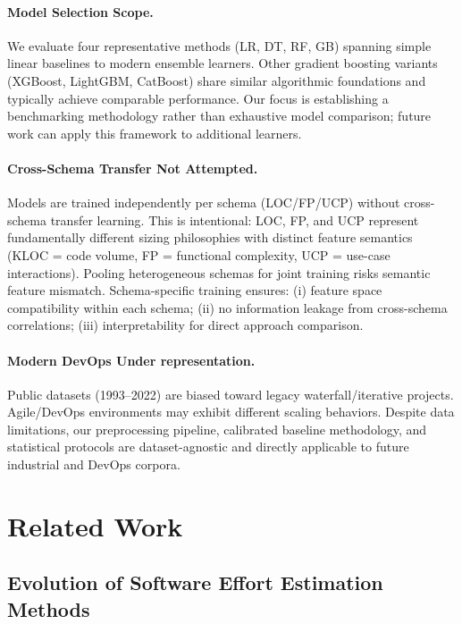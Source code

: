 \documentclass[11pt,a4paper]{article}
\begin{document}
\paragraph{Model Selection Scope.}
We evaluate four representative methods (LR, DT, RF, GB) spanning simple linear baselines to modern ensemble learners. Other gradient boosting variants (XGBoost, LightGBM, CatBoost) share similar algorithmic foundations and typically achieve comparable performance. Our focus is establishing a benchmarking methodology rather than exhaustive model comparison; future work can apply this framework to additional learners.

\paragraph{Cross-Schema Transfer Not Attempted.}
Models are trained independently per schema (LOC/FP/UCP) without cross-schema transfer learning. This is intentional: LOC, FP, and UCP represent fundamentally different sizing philosophies with distinct feature semantics (KLOC = code volume, FP = functional complexity, UCP = use-case interactions). Pooling heterogeneous schemas for joint training risks semantic feature mismatch. Schema-specific training ensures: (i) feature space compatibility within each schema; (ii) no information leakage from cross-schema correlations; (iii) interpretability for direct approach comparison.

\paragraph{Modern DevOps Under representation.}
Public datasets (1993--2022) are biased toward legacy waterfall/iterative projects. Agile/DevOps environments may exhibit different scaling behaviors. Despite data limitations, our preprocessing pipeline, calibrated baseline methodology, and statistical protocols are dataset-agnostic and directly applicable to future industrial and DevOps corpora.




\section{Related Work}


\subsection{Evolution of Software Effort Estimation Methods}
\end{document}
